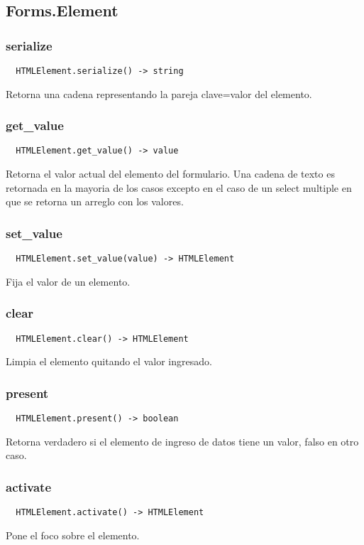 \subsection{Forms.Element}
\subsubsection*{serialize}
\begin{verbatim}
  HTMLElement.serialize() -> string
\end{verbatim}
Retorna una cadena representando la pareja clave=valor del elemento.

\subsubsection*{get\_value}
\begin{verbatim}
  HTMLElement.get_value() -> value
\end{verbatim}
Retorna el valor actual del elemento del formulario. Una cadena de texto es retornada en la mayoria de los casos excepto en el caso de un select multiple en que se retorna un arreglo con los valores.

\subsubsection*{set\_value}
\begin{verbatim}
  HTMLElement.set_value(value) -> HTMLElement
\end{verbatim}
Fija el valor de un elemento.

\subsubsection*{clear}
\begin{verbatim}
  HTMLElement.clear() -> HTMLElement
\end{verbatim}
Limpia el elemento quitando el valor ingresado.

\subsubsection*{present}
\begin{verbatim}
  HTMLElement.present() -> boolean
\end{verbatim}
Retorna verdadero si el elemento de ingreso de datos tiene un valor, falso en otro caso.

\subsubsection*{activate}
\begin{verbatim}
  HTMLElement.activate() -> HTMLElement
\end{verbatim}
Pone el foco sobre el elemento.

